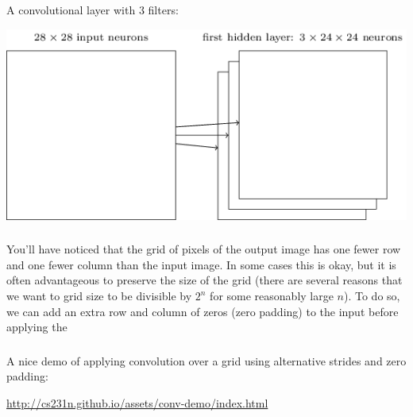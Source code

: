 \documentclass[xetex,mathserif,serif,aspectratio=169]{beamer}
\begin{document}
\begin{frame}[fragile] \frametitle{} \oldB \small

A convolutional layer with $3$ filters:

\begin{center}
\includegraphics[height=0.7\textheight]{img/tikz46.png}
\end{center}

\end{frame}

\begin{frame}[fragile] \frametitle{} \oldB \small

\textbf{}

You'll have noticed that the grid of pixels of the output image
has one fewer row and one fewer column than the input image.
In some cases this is okay, but it is often advantageous to
preserve the size of the grid (there are several reasons that we
want to grid size to be divisible by $2^n$ for some reasonably large
$n$). To do so, we can add an extra row and column of zeros
(zero padding) to the input before applying the

\end{frame}

\begin{frame}[fragile] \frametitle{} \oldB \small

A nice demo of applying convolution over a grid using alternative
strides and zero padding:

\begin{center}
\url{http://cs231n.github.io/assets/conv-demo/index.html}
\end{center}

\end{frame}
\end{document}
